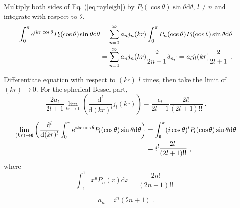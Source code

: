 \documentclass[12pt,a4paper]{article}
\newcommand{\dif}{\mathrm{d}}
\begin{document}
Multiply both sides of Eq. (\ref{eq:rayleigh}) by $P_l(\cos \theta) \sin \theta \dif \theta$, $l \neq n$ and integrate with respect to $\theta$. 
\begin{align}
\nonumber \int_0^\pi {\rm e}^{i kr \cos \theta} P_l(\cos \theta) \sin \theta \dif \theta &= \sum_{n=0}^\infty a_n j_n(kr) \int_0^\pi P_n(\cos \theta) P_l(\cos \theta) \sin \theta \dif \theta \\
\nonumber &= \sum_{n=0}^\infty a_n j_n(kr) \dfrac{2}{2n+1} \delta_{n,l} = a_l j_l(kr) \dfrac{2}{2l+1} ~.
\end{align}

Differentiate equation with respect to $(kr)$ $l$ times, then take the limit of $(kr) \rightarrow 0$. For the spherical Bessel part,
\begin{equation}
\dfrac{2a_l}{2l +1} \lim_{kr \rightarrow 0} \left(\dfrac{\dif^l}{\dif (kr)^l} j_l(kr) \right) = \dfrac{a_l}{2l+1} \dfrac{2 l!}{(2l+1)!!} ~.
\end{equation}

\begin{align}
\nonumber \lim_{(kr) \rightarrow 0} \left(\dfrac{\dif^l}{\dif (kr)^l} \int_0^\pi {\rm e}^{i kr \cos \theta} P_l(\cos \theta) \sin \theta \dif \theta \right) &= \int_0^\pi (i\cos \theta)^l P_l(\cos \theta) \sin \theta \dif \theta \\
\nonumber &= i^l \dfrac{2 l!}{(2l+1)!!} ~,
\end{align}
where 
\begin{equation}
\int_{-1}^1 x^n P_n(x) \dif x = \dfrac{2 n!}{(2n+1)!!} ~.
\end{equation}

\begin{equation}
a_n = i^n (2n+1) ~.
\end{equation}
















\end{document}
